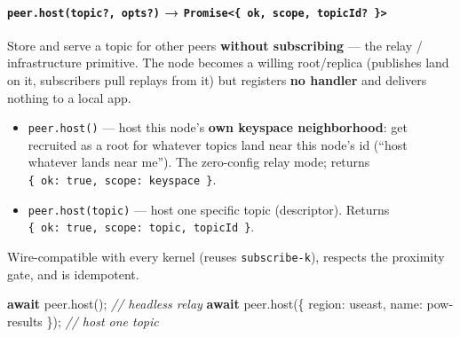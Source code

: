 \documentclass[
  nobib]{tufte-handout}
\newenvironment{Shaded}{}{}
\newcommand{\CommentTok}[1]{\textcolor[rgb]{0.38,0.63,0.69}{\textit{#1}}}
\newcommand{\ControlFlowTok}[1]{\textcolor[rgb]{0.00,0.44,0.13}{\textbf{#1}}}
\newcommand{\DataTypeTok}[1]{\textcolor[rgb]{0.56,0.13,0.00}{#1}}
\newcommand{\FunctionTok}[1]{\textcolor[rgb]{0.02,0.16,0.49}{#1}}
\newcommand{\NormalTok}[1]{#1}
\newcommand{\OperatorTok}[1]{\textcolor[rgb]{0.40,0.40,0.40}{#1}}
\newcommand{\StringTok}[1]{\textcolor[rgb]{0.25,0.44,0.63}{#1}}
\providecommand{\tightlist}{%
  \setlength{\itemsep}{0pt}\setlength{\parskip}{0pt}}
\renewcommand{\subsubsection}[1]{\medskip\par\noindent{\normalsize\bfseries #1}\par\nobreak\smallskip}
\begin{document}
\subsubsection{4.5 hosting: host / unhost}\label{hosting-host-unhost}

\paragraph{\texorpdfstring{\texttt{peer.host(topic?,\ opts?)} →
\texttt{Promise\textless{}\{\ ok,\ scope,\ topicId?\ \}\textgreater{}}}{peer.host(topic?, opts?) → Promise\textless\{ ok, scope, topicId? \}\textgreater{}}}\label{peer.hosttopic-opts-promise-ok-scope-topicid}

Store and serve a topic for other peers \textbf{without subscribing} ---
the relay / infrastructure primitive. The node becomes a willing
root/replica (publishes land on it, subscribers pull replays from it)
but registers \textbf{no handler} and delivers nothing to a local app.

\begin{itemize}
\tightlist
\item
  \texttt{peer.host()} --- host this node's \textbf{own keyspace
  neighborhood}: get recruited as a root for whatever topics land near
  this node's id (``host whatever lands near me''). The zero-config
  relay mode; returns
  \texttt{\{\ ok:\ true,\ scope:\ \textquotesingle{}keyspace\textquotesingle{}\ \}}.
\item
  \texttt{peer.host(topic)} --- host one specific topic (descriptor).
  Returns
  \texttt{\{\ ok:\ true,\ scope:\ \textquotesingle{}topic\textquotesingle{},\ topicId\ \}}.
\end{itemize}

Wire-compatible with every kernel (reuses \texttt{subscribe-k}),
respects the proximity gate, and is idempotent.

\begin{Shaded}
\begin{Highlighting}[]
\ControlFlowTok{await}\NormalTok{ peer}\OperatorTok{.}\FunctionTok{host}\NormalTok{()}\OperatorTok{;}                                          \CommentTok{// headless relay}
\ControlFlowTok{await}\NormalTok{ peer}\OperatorTok{.}\FunctionTok{host}\NormalTok{(\{ }\DataTypeTok{region}\OperatorTok{:} \StringTok{\textquotesingle{}useast\textquotesingle{}}\OperatorTok{,} \DataTypeTok{name}\OperatorTok{:} \StringTok{\textquotesingle{}pow{-}results\textquotesingle{}}\NormalTok{ \})}\OperatorTok{;} \CommentTok{// host one topic}
\end{Highlighting}
\end{Shaded}
\end{document}
